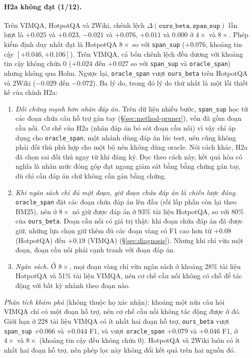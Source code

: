 \documentclass[11pt]{article}
\newcommand{\arm}[1]{\texttt{#1}}
\begin{document}
\paragraph{H2a không đạt (1/12).} Trên VIMQA, HotpotQA và 2Wiki, chênh lệch
$\Delta(\arm{ours\_beta},\arm{span\_sup})$ lần lượt là $+0.025$ và $+0.023$, $-0.021$ và $+0.076$,
$+0.011$ và $0.000$ ở $4\times$ và $8\times$. Phép kiểm định duy nhất đạt là HotpotQA $8\times$ so với
\arm{span\_sup} ($+0.076$, khoảng tin cậy $[+0.046, +0.106]$). Trên VIMQA, cả bốn chênh lệch đều dương với
khoảng tin cậy không chứa 0 ($+0.024$ đến $+0.027$ so với \arm{span\_sup} và \arm{oracle\_span}) nhưng không
qua Holm. Ngược lại, \arm{oracle\_span} vượt \arm{ours\_beta} trên HotpotQA và 2Wiki ($-0.029$ đến $-0.072$).
Ba lý do, trong đó lý do thứ nhất là một lỗi thiết kế của chính H2a:
\begin{enumerate}
  \item \emph{Đối chứng mạnh hơn nhãn đáp án.} Trên dữ liệu nhiều bước, \arm{span\_sup} học từ các đoạn
  chứa câu hỗ trợ gán tay (\S\ref{sec:method-pruner}), vốn đã gồm đoạn cầu nối. Cơ chế của H2a (nhãn đáp
  án bỏ sót đoạn cầu nối) vì vậy chỉ áp dụng cho \arm{oracle\_span}, một nhánh dùng đáp án lúc test, nên cũng không
  phải đối thủ phù hợp cho một bộ nén không dùng oracle. Nói cách khác, H2a đã chọn sai đối thủ ngay từ khi đăng ký.
  Đọc theo cách này, kết quả hòa có
  nghĩa là nhãn mức đóng góp đạt ngang giám sát bằng bằng chứng gán tay, dù chỉ cần đáp án chứ không cần
  gán bằng chứng.
  \item \emph{Khi ngân sách chỉ đủ một đoạn, giữ đoạn chứa đáp án là chiến lược đúng.} \arm{oracle\_span} đặt
  các đoạn chứa đáp án lên đầu (rồi lấp phần còn lại theo BM25), nên ở $8\times$ nó giữ được đáp án ở 93\% tài
  liệu HotpotQA, so với 80\% của \arm{ours\_beta}. Đoạn cầu nối có giá trị thật: khi đoạn chứa đáp án đã được
  giữ, những lựa chọn giữ thêm đủ các đoạn vàng có F1 cao hơn từ $+0.08$ (HotpotQA) đến $+0.19$ (VIMQA)
  (\S\ref{sec:diagnosis}).
  Nhưng khi chỉ vừa một đoạn, đoạn cầu nối phải cạnh tranh với đoạn đáp án.
  \item \emph{Ngân sách.} Ở $8\times$, mọi đoạn vàng chỉ vừa ngân sách ở khoảng 28\% tài liệu HotpotQA và 51\%
  tài liệu VIMQA, nên cơ chế cầu nối không có chỗ để tác động với bất kỳ nhánh theo đoạn nào.
\end{enumerate}
\emph{Phân tích khám phá} (không thuộc họ xác nhận): khoảng một nửa câu hỏi VIMQA chỉ có một đoạn hỗ trợ,
nên cơ chế cầu nối không tác động được ở đó. Giới hạn ở 228 tài liệu VIMQA có ít nhất hai đoạn hỗ trợ,
\arm{ours\_beta} vượt \arm{span\_sup} $+0.066$ và $+0.044$ F1, và vượt \arm{oracle\_span} $+0.079$ và $+0.046$
F1, ở $4\times$ và $8\times$ (khoảng tin cậy đều không chứa 0). HotpotQA và 2Wiki luôn có ít nhất hai đoạn hỗ
trợ, nên phép lọc này không đổi kết quả trên hai nguồn đó.
\end{document}
